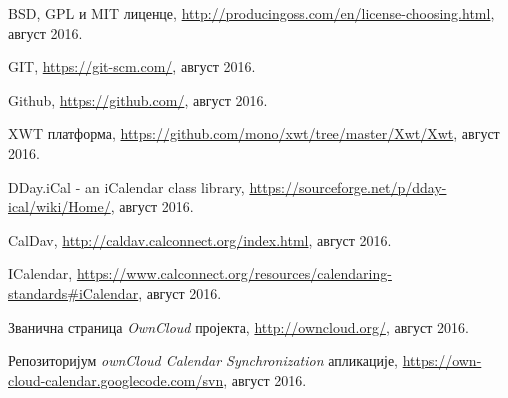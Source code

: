 %
%
\begin{thebibliography}{11}
 {BSD, GPL и MIT лиценце, \url{http://producingoss.com/en/license-choosing.html}}, август 2016.

 {GIT, \url{https://git-scm.com/}}, август 2016.

 {Github, \url{https://github.com/}}, август 2016.

 {XWT платформа, \url{https://github.com/mono/xwt/tree/master/Xwt/Xwt}}, август 2016.

 {DDay.iCal - an iCalendar class library, \url{https://sourceforge.net/p/dday-ical/wiki/Home/}}, август 2016.

 {CalDav, \url{http://caldav.calconnect.org/index.html}}, август 2016.

 {ICalendar, \url{https://www.calconnect.org/resources/calendaring-standards#iCalendar}}, август 2016.

 {Званична страница {\it OwnCloud} пројекта, \url{http://owncloud.org/}}, август 2016.

 {Репозиторијум {\it ownCloud Calendar Synchronization} апликације, \url{https://own-cloud-calendar.googlecode.com/svn}}, август 2016.

\end{thebibliography}

